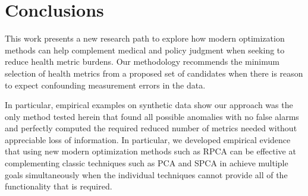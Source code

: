 \documentclass[conference]{IEEEtran}
\begin{document}



\section{Conclusions}

This work presents a new research path to explore how modern optimization methods can help complement medical and policy judgment when seeking to reduce health metric burdens.  Our methodology recommends  the minimum selection of health metrics from a proposed set of candidates when there is reason to expect confounding measurement errors in the data.

In particular, empirical examples on synthetic data show our approach was the only method tested herein that found all possible anomalies with no false alarms and perfectly computed the required reduced number of metrics needed without appreciable loss of information.   In particular, we developed empirical evidence that using new modern optimization methods such as RPCA can be effective at complementing classic techniques such as PCA and SPCA in achieve multiple goals simultaneously when the individual techniques cannot provide all of the functionality that is required.

\end{document}
